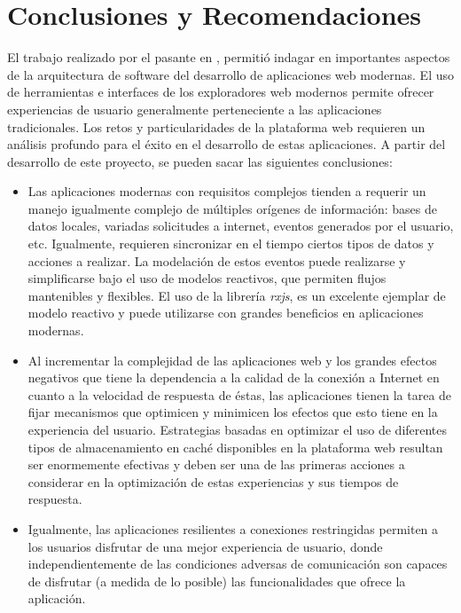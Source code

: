 \chapter{Conclusiones y Recomendaciones}

El trabajo realizado por el pasante en \business, permitió indagar en importantes aspectos de la arquitectura de software del desarrollo de aplicaciones web modernas. El uso de herramientas e interfaces de los exploradores web modernos permite ofrecer experiencias de usuario generalmente perteneciente a las aplicaciones tradicionales. Los retos y particularidades de la plataforma web requieren un análisis profundo para el éxito en el desarrollo de estas aplicaciones. A partir del desarrollo de este proyecto, se pueden sacar las siguientes conclusiones:

\begin{itemize}

  \item Las aplicaciones modernas con requisitos complejos tienden a requerir un manejo igualmente complejo de múltiples orígenes de información: bases de datos locales, variadas solicitudes a internet, eventos generados por el usuario, etc. Igualmente, requieren sincronizar en el tiempo ciertos tipos de datos y acciones a realizar. La modelación de estos eventos puede realizarse y simplificarse bajo el uso de modelos reactivos, que permiten flujos mantenibles y flexibles. El uso de la librería \textit{rxjs}, es un excelente ejemplar de modelo reactivo y puede utilizarse con grandes beneficios en aplicaciones modernas.

  \item Al incrementar la complejidad de las aplicaciones web y los grandes efectos negativos que tiene la dependencia a la calidad de la conexión a Internet en cuanto a la velocidad de respuesta de éstas, las aplicaciones tienen la tarea de fijar mecanismos que optimicen y minimicen los efectos que esto tiene en la experiencia del usuario. Estrategias basadas en optimizar el uso de diferentes tipos de almacenamiento en caché disponibles en la plataforma web resultan ser enormemente efectivas y deben ser una de las primeras acciones a considerar en la optimización de estas experiencias y sus tiempos de respuesta.

  \item Igualmente, las aplicaciones resilientes a conexiones restringidas permiten a los usuarios disfrutar de una mejor experiencia de usuario, donde independientemente de las condiciones adversas de comunicación son capaces de disfrutar (a medida de lo posible) las funcionalidades que ofrece la aplicación.

\end{itemize}

